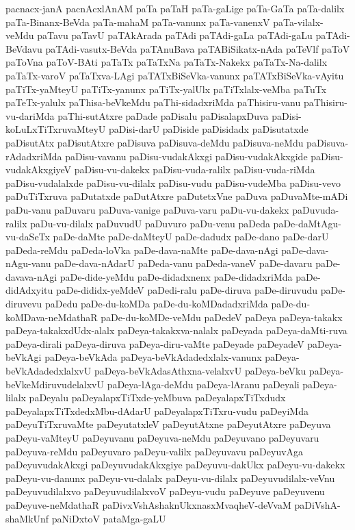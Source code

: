 {pacnacx-janA
pacnAcxlAnAM
paTa
paTaH
paTa-gaLige
paTa-GaTa
paTa-dalilx
paTa-Binanx-BeVda
paTa-mahaM
paTa-vanunx
paTa-vanenxV
paTa-vilalx-veMdu
paTavu
paTavU
paTAkArada
paTAdi
paTAdi-gaLa
paTAdi-gaLu
paTAdi-BeVdavu
paTAdi-vasutx-BeVda
paTAnuBava
paTABiSikatx-nAda
paTeVlf
paToV
paToVna
paToV-BAti
paTaTx
paTaTxNa
paTaTx-Nakekx
paTaTx-Na-dalilx
paTaTx-varoV
paTaTxva-LAgi
paTATxBiSeVka-vanunx
paTATxBiSeVka-vAyitu
paTiTx-yaMteyU
paTiTx-yanunx
paTiTx-yalUlx
paTiTxlalx-veMba
paTuTx
paTeTx-yalulx
paThisa-beVkeMdu
paThi-sidadxriMda
paThisiru-vanu
paThisiru-vu-dariMda
paThi-sutAtxre
paDade
paDisalu
paDisalapxDuva
paDisi-koLuLxTiTxruvaMteyU
paDisi-darU
paDiside
paDisidadx
paDisutatxde
paDisutAtx
paDisutAtxre
paDisuva
paDisuva-deMdu
paDisuva-neMdu
paDisuva-rAdadxriMda
paDisu-vavanu
paDisu-vudakAkxgi
paDisu-vudakAkxgide
paDisu-vudakAkxgiyeV
paDisu-vu-dakekx
paDisu-vuda-ralilx
paDisu-vuda-riMda
paDisu-vudalalxde
paDisu-vu-dilalx
paDisu-vudu
paDisu-vudeMba
paDisu-vevo
paDuTiTxruva
paDutatxde
paDutAtxre
paDutetxVne
paDuva
paDuvaMte-mADi
paDu-vanu
paDuvaru
paDuva-vanige
paDuva-varu
paDu-vu-dakekx
paDuvuda-ralilx
paDu-vu-dilalx
paDuvudU
paDuvuro
paDu-venu
paDeda
paDe-daMtAgu-vu-daSeTx
paDe-daMte
paDe-daMteyU
paDe-dadudx
paDe-dano
paDe-darU
paDeda-reMdu
paDeda-loVka
paDe-dava-naMte
paDe-dava-nAgi
paDe-dava-nAgu-vanu
paDe-dava-nAdarU
paDeda-vanu
paDeda-vaneV
paDe-davaru
paDe-davava-nAgi
paDe-dide-yeMdu
paDe-didadxnenx
paDe-didadxriMda
paDe-didAdxyitu
paDe-dididx-yeMdeV
paDedi-ralu
paDe-diruva
paDe-diruvudu
paDe-diruvevu
paDedu
paDe-du-koMDa
paDe-du-koMDadadxriMda
paDe-du-koMDava-neMdathaR
paDe-du-koMDe-veMdu
paDedeV
paDeya
paDeya-takakx
paDeya-takakxdUdx-alalx
paDeya-takakxva-nalalx
paDeyada
paDeya-daMti-ruva
paDeya-dirali
paDeya-diruva
paDeya-diru-vaMte
paDeyade
paDeyadeV
paDeya-beVkAgi
paDeya-beVkAda
paDeya-beVkAdadedxlalx-vanunx
paDeya-beVkAdadedxlalxvU
paDeya-beVkAdasAthxna-velalxvU
paDeya-beVku
paDeya-beVkeMdiruvudelalxvU
paDeya-lAga-deMdu
paDeya-lAranu
paDeyali
paDeya-lilalx
paDeyalu
paDeyalapxTiTxde-yeMbuva
paDeyalapxTiTxdudx
paDeyalapxTiTxdedxMbu-dAdarU
paDeyalapxTiTxru-vudu
paDeyiMda
paDeyuTiTxruvaMte
paDeyutatxleV
paDeyutAtxne
paDeyutAtxre
paDeyuva
paDeyu-vaMteyU
paDeyuvanu
paDeyuva-neMdu
paDeyuvano
paDeyuvaru
paDeyuva-reMdu
paDeyuvaro
paDeyu-valilx
paDeyuvavu
paDeyuvAga
paDeyuvudakAkxgi
paDeyuvudakAkxgiye
paDeyuvu-dakUkx
paDeyu-vu-dakekx
paDeyu-vu-danunx
paDeyu-vu-dalalx
paDeyu-vu-dilalx
paDeyuvudilalx-veVnu
paDeyuvudilalxvo
paDeyuvudilalxvoV
paDeyu-vudu
paDeyuve
paDeyuvenu
paDeyuve-neMdathaR
paDivxVshAshaknUkxnasxMvaqheV-deVvaM
paDiVshA-shaMkUnf
paNiDxtoV
pataMga-gaLU
}
